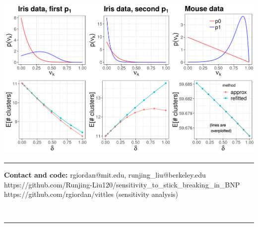 \documentclass[a0,plainsections,30pt]{sciposter}\usepackage[]{graphicx}\usepackage[]{color}
\newenvironment{knitrout}{}{} %
\begin{document}
\begin{minipage}[t]{0.45\textwidth}
\begin{knitrout}
{\centering \includegraphics[width=0.98\linewidth,height=0.588\linewidth]{figure/functional_sens_plot-1} 

}



\end{knitrout}

\noindent\rule{0.95\textwidth}{1pt}

\textbf{Contact and code:} rgiordan@mit.edu, runjing\_liu@berkeley.edu
{\color{blue} https://github.com/Runjing-Liu120/sensitivity\_to\_stick\_breaking\_in\_BNP}
{\color{blue} https://github.com/rgiordan/vittles}
(sensitivity analysis)

\end{minipage}\\

\begin{center}
\noindent\rule{0.95\textwidth}{1pt}
\end{center}


\renewcommand{\section}[2]{}%
\footnotesize{
  
  
}
\end{document}

